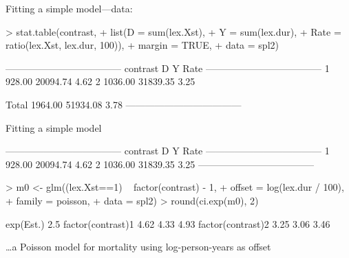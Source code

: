 \begin{frame}[fragile]{Fitting a simple model---data:}
\begin{Schunk}
\begin{Sinput}
> stat.table(contrast,
+            list(D = sum(lex.Xst),
+                 Y = sum(lex.dur),
+              Rate = ratio(lex.Xst, lex.dur, 100)),
+            margin = TRUE,
+              data = spl2)
\end{Sinput}
\begin{Soutput}
 ------------------------------------ 
 contrast         D        Y    Rate  
 ------------------------------------ 
 1           928.00 20094.74    4.62  
 2          1036.00 31839.35    3.25  
                                      
 Total      1964.00 51934.08    3.78  
 ------------------------------------ 
\end{Soutput}
\end{Schunk}
\end{frame}

\begin{frame}[fragile]{Fitting a simple model}
\begin{Schunk}
\begin{Soutput}
 ------------------------------------ 
 contrast         D        Y    Rate  
 ------------------------------------ 
 1           928.00 20094.74    4.62  
 2          1036.00 31839.35    3.25  
 ------------------------------------ 
\end{Soutput}
\end{Schunk}
\begin{Schunk}
\begin{Sinput}
> m0 <- glm((lex.Xst==1) ~ factor(contrast) - 1,
+           offset = log(lex.dur / 100),
+           family = poisson,
+             data = spl2)
> round(ci.exp(m0), 2)
\end{Sinput}
\begin{Soutput}
                  exp(Est.) 2.5%
factor(contrast)1      4.62 4.33  4.93
factor(contrast)2      3.25 3.06  3.46
\end{Soutput}
\end{Schunk}
\small
\ldots a Poisson model for mortality using log-person-years as offset
\end{frame}

